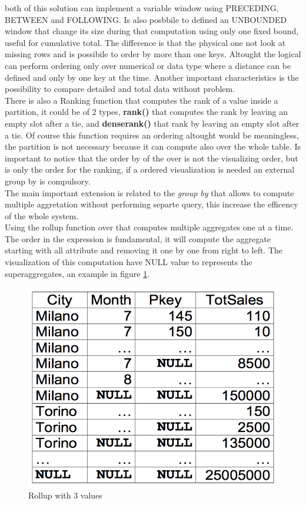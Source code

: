 \documentclass[12pt]{article}
\begin{document}
both of this solution can implement a variable window using PRECEDING, BETWEEN and FOLLOWING. Is also posbbile to defined an UNBOUNDED window that change its size during that computation using only one fixed bound, useful for cumulative total. The difference is that the physical one not look at missing rows and is possibile to order by more than one keys. Altought the logical can perform ordering only over numerical or data type where a distance can be defined and only by one key at the time. Another important characteristics is the possibility to compare detailed and total data without problem.\\
There is also a Ranking function that computes the rank of a value inside a partition, it could be of 2 types, \textbf{rank()} that computes the rank by leaving an empty slot after a tie, and \textbf{denserank()} that rank by leaving an empty slot after a tie. Of course this function requires an ordering altought would be meaningless, the partition is not necessary because it can compute also over the whole table. Is important to notice that the order by of the over is not the visualizing order, but is only the order for the ranking, if a ordered visualization is needed an external group by is compulsory.\\
The main important extension is related to the \textit{group by} that allows to compute multiple aggretation without performing separte query, this increase the efficency of the whole system.\\
Using the rollup function over that computes multiple aggregates one at a time. The order in the expression is fundamental, it will compute the aggregate starting with all attribute and removing it one by one from right to left. The visualization of this computation have NULL value to represents the superaggregates, an example in figure \ref{fig:rollup}.
\begin{figure}[h!]
  \centering
  \includegraphics[width=0.8\linewidth]{images/rollup.png}
  \caption{Rollup with 3 values}
  \label{fig:rollup}
\end{figure}
\end{document}
